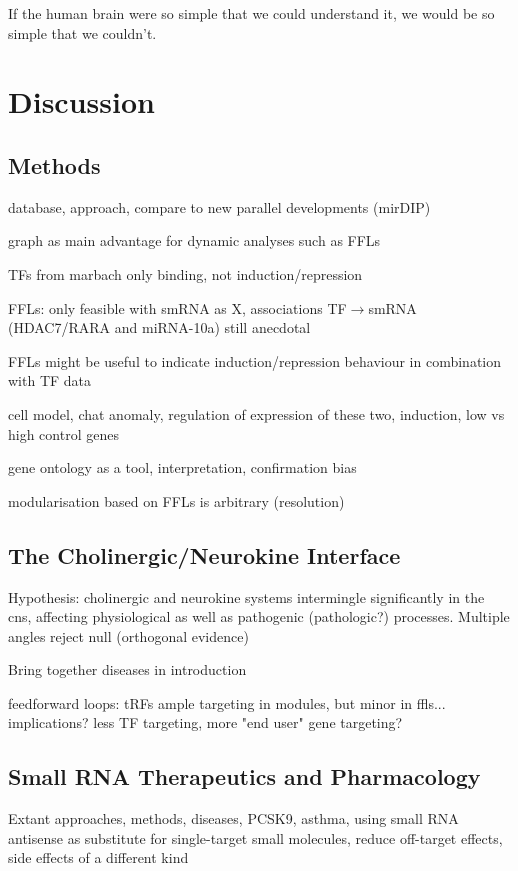 \begin{savequote}[75mm]
If the human brain were so simple that we could understand it, we would be so simple that we couldn’t.
\end{savequote}

\chapter{Discussion}
\section{Methods} \label{sec:discussion:methods}
database, approach, compare to new parallel developments (mirDIP)

graph as main advantage for dynamic analyses such as FFLs

TFs from marbach only binding, not induction/repression

FFLs: only feasible with smRNA as X, associations TF$\to$smRNA (HDAC7/RARA and miRNA-10a) still anecdotal 

FFLs might be useful to indicate induction/repression behaviour in combination with TF data

cell model, chat anomaly, regulation of expression of these two, induction, low vs high control genes

gene ontology as a tool, interpretation, confirmation bias

modularisation based on FFLs is arbitrary (resolution)

\section{The Cholinergic/Neurokine Interface}
Hypothesis: cholinergic and neurokine systems intermingle significantly in the cns, affecting physiological as well as pathogenic (pathologic?) processes. Multiple angles reject null (orthogonal evidence)

Bring together diseases in introduction

feedforward loops: tRFs ample targeting in modules, but minor in ffls... implications? less TF targeting, more "end user" gene targeting?

\section{Small RNA Therapeutics and Pharmacology} \label{sec:discussion:therapy}
Extant approaches, methods, diseases, PCSK9, asthma, using small RNA antisense as substitute for single-target small molecules, reduce off-target effects, side effects of a different kind

